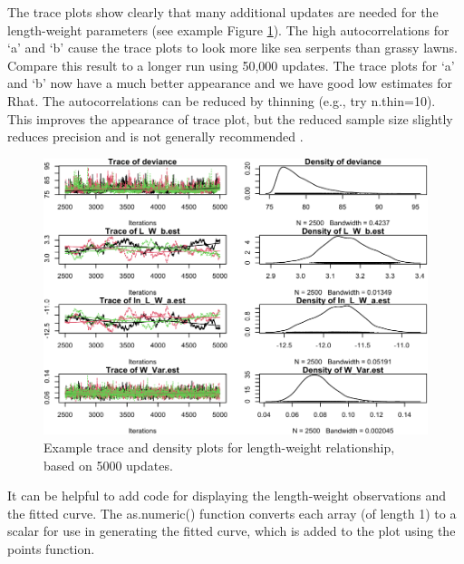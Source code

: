 \documentclass[
]{krantz}
\begin{document}
The trace plots show clearly that many additional updates are needed for the length-weight parameters (see example Figure \ref{fig:LnWtPlot}). The high autocorrelations for `a' and `b' cause the trace plots to look more like sea serpents than grassy lawns. Compare this result to a longer run using 50,000 updates. The trace plots for `a' and `b' now have a much better appearance and we have good low estimates for Rhat. The autocorrelations can be reduced by thinning (e.g., try n.thin=10). This improves the appearance of trace plot, but the reduced sample size slightly reduces precision and is not generally recommended \citep{link.eaton2012}.

\begin{figure}
\includegraphics[width=0.9\linewidth]{bookdown_files/figure-latex/LnWtPlot-1} \caption{Example trace and density plots for length-weight relationship, based on 5000 updates.}\label{fig:LnWtPlot}
\end{figure}

It can be helpful to add code for displaying the length-weight observations and the fitted curve. The as.numeric() function converts each array (of length 1) to a scalar for use in generating the fitted curve, which is added to the plot using the points function.
\end{document}
